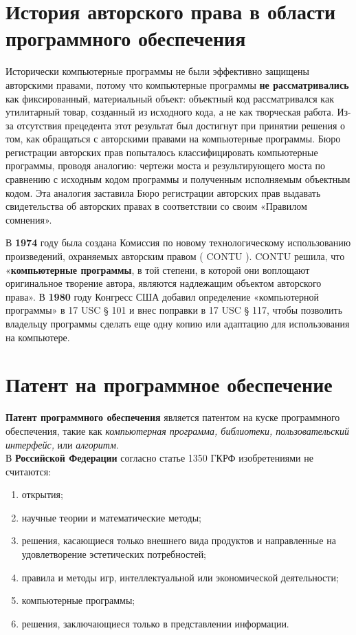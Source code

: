 \documentclass[12pt, oneside, a4paper]{article}
\begin{document}
\begin{sloppypar}
\section{История авторского права в области программного обеспечения}
Исторически компьютерные программы не были эффективно защищены авторскими правами, потому что компьютерные программы \textbf{не рассматривались} как фиксированный, материальный объект: объектный код рассматривался как утилитарный товар, созданный из исходного кода, а не как творческая работа. Из-за отсутствия прецедента этот результат был достигнут при принятии решения о том, как обращаться с авторскими правами на компьютерные программы. Бюро регистрации авторских прав попыталось классифицировать компьютерные программы, проводя аналогию: чертежи моста и результирующего моста по сравнению с исходным кодом программы и полученным исполняемым объектным кодом. Эта аналогия заставила Бюро регистрации авторских прав выдавать свидетельства об авторских правах в соответствии со своим «Правилом сомнения».

В \textbf{1974} году была создана Комиссия по новому технологическому использованию произведений, охраняемых авторским правом ( CONTU ). CONTU решила, что «\textbf{компьютерные программы}, в той степени, в которой они воплощают оригинальное творение автора, являются надлежащим объектом авторского права». В \textbf{1980} году Конгресс США добавил определение «компьютерной программы» в 17 USC  § 101 и внес поправки в 17 USC  § 117, чтобы позволить владельцу программы сделать еще одну копию или адаптацию для использования на компьютере.

\newpage


\section{Патент на программное обеспечение}
\textbf{Патент программного обеспечения} является патентом на куске программного обеспечения, такие как \textit{компьютерная программа, библиотеки, пользовательский интерфейс,} или \textit{алгоритм}. \\


В \textbf{Российской Федерации} согласно статье 1350 ГКРФ изобретениями не считаются: 
\begin{enumerate}
\item открытия; 
\item научные теории и математические методы;
\item решения, касающиеся только внешнего вида продуктов и направленные на удовлетворение эстетических потребностей;
\item правила и методы игр, интеллектуальной или экономической деятельности;
\item компьютерные программы;
\item решения, заключающиеся только в представлении информации.
\end{enumerate}%
 

\end{sloppypar}
\end{document}
